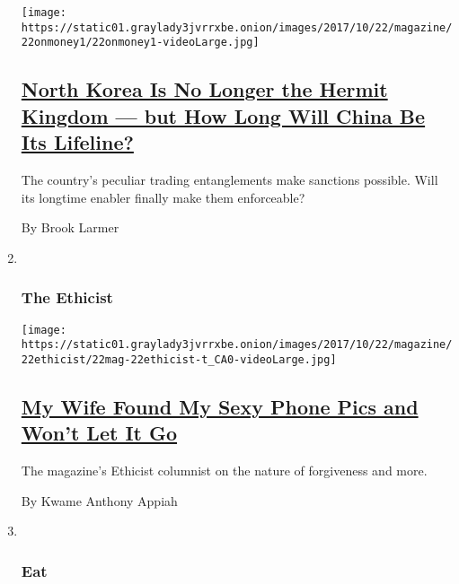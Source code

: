 \begin{enumerate}
  \texttt{[image: https://static01.graylady3jvrrxbe.onion/images/2017/10/22/magazine/22onmoney1/22onmoney1-videoLarge.jpg]}

  \hypertarget{north-korea-is-no-longer-the-hermit-kingdom--but-how-long-will-china-be-its-lifeline}{%
  \subsection{\texorpdfstring{\href{/2017/10/18/magazine/north-korea-is-no-longer-the-hermit-kingdom-but-how-long-will-china-be-its-lifeline.html}{North
  Korea Is No Longer the Hermit Kingdom --- but How Long Will China Be
  Its
  Lifeline?}}{North Korea Is No Longer the Hermit Kingdom --- but How Long Will China Be Its Lifeline?}}\label{north-korea-is-no-longer-the-hermit-kingdom--but-how-long-will-china-be-its-lifeline}}

  The country's peculiar trading entanglements make sanctions possible.
  Will its longtime enabler finally make them enforceable?

  By Brook Larmer
\item ~
  \hypertarget{the-ethicist}{%
  \subsubsection{The Ethicist}\label{the-ethicist}}

  \texttt{[image: https://static01.graylady3jvrrxbe.onion/images/2017/10/22/magazine/22ethicist/22mag-22ethicist-t\_CA0-videoLarge.jpg]}

  \hypertarget{my-wife-found-my-sexy-phone-pics-and-wont-let-it-go}{%
  \subsection{\texorpdfstring{\href{/2017/10/18/magazine/my-wife-found-my-sexy-phone-pics-and-wont-let-it-go.html}{My
  Wife Found My Sexy Phone Pics and Won't Let It
  Go}}{My Wife Found My Sexy Phone Pics and Won't Let It Go}}\label{my-wife-found-my-sexy-phone-pics-and-wont-let-it-go}}

  The magazine's Ethicist columnist on the nature of forgiveness and
  more.

  By Kwame Anthony Appiah
\item ~
  \hypertarget{eat}{%
  \subsubsection{Eat}\label{eat}}


\end{enumerate}
